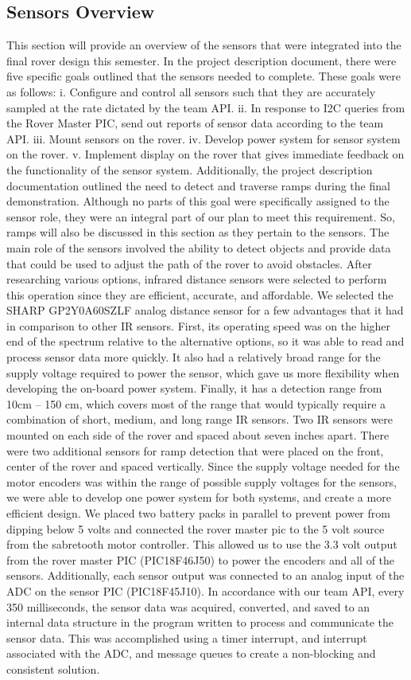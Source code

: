 \subsection{Sensors Overview}
This section will provide an overview of the sensors that were integrated into the final rover design this semester.  In the project description document, there were five specific goals outlined that the sensors needed to complete.  These goals were as follows: 
i.	Configure and control all sensors such that they are accurately sampled at the rate dictated by the team API.
ii.	In response to I2C queries from the Rover Master PIC, send out reports of sensor data according to the team API.
iii.	Mount sensors on the rover.
iv.	Develop power system for sensor system on the rover.
v.	Implement display on the rover that gives immediate feedback on the functionality of the sensor system.
Additionally, the project description documentation outlined the need to detect and traverse ramps during the final demonstration.  Although no parts of this goal were specifically assigned to the sensor role, they were an integral part of our plan to meet this requirement.  So, ramps will also be discussed in this section as they pertain to the sensors.
The main role of the sensors involved the ability to detect objects and provide data that could be used to adjust the path of the rover to avoid obstacles.  After researching various options, infrared distance sensors were selected to perform this operation since they are efficient, accurate, and affordable.  We selected the SHARP GP2Y0A60SZLF analog distance sensor for a few advantages that it had in comparison to other IR sensors.  First, its operating speed was on the higher end of the spectrum relative to the alternative options, so it was able to read and process sensor data more quickly.  It also had a relatively broad range for the supply voltage required to power the sensor, which gave us more flexibility when developing the on-board power system.  Finally, it has a detection range from 10cm – 150 cm, which covers most of the range that would typically require a combination of short, medium, and long range IR sensors.  
Two IR sensors were mounted on each side of the rover and spaced about seven inches apart.  There were two additional sensors for ramp detection that were placed on the front, center of the rover and spaced vertically.  Since the supply voltage needed for the motor encoders was within the range of possible supply voltages for the sensors, we were able to develop one power system for both systems, and create a more efficient design.  We placed two battery packs in parallel to prevent power from dipping below 5 volts and connected the rover master pic to the 5 volt source from the sabretooth motor controller.  This allowed us to use the 3.3 volt output from the rover master PIC (PIC18F46J50) to power the encoders and all of the sensors.  Additionally, each sensor output was connected to an analog input of the ADC on the sensor PIC (PIC18F45J10).  In accordance with our team API, every 350 milliseconds, the sensor data was acquired, converted, and saved to an internal data structure in the program written to process and communicate the sensor data.  This was accomplished using a timer interrupt, and interrupt associated with the ADC, and message queues to create a non-blocking and consistent solution.  
